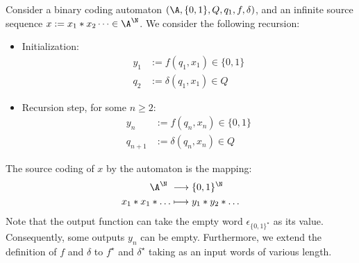 \documentclass[toc]{../cs-classes/cs-classes}
\begin{document}
\begin{definition}
    Consider a binary coding automaton $(\A, \{0, 1\}, Q, q_1, f, \delta)$, and an infinite source sequence $x:=x_1*x_2\dots\in\A^\N$.
    We consider the following recursion:
    \begin{itemize}
        \item Initialization:
        \begin{equation*}
            \begin{aligned}
                y_1 &:= f(q_1, x_1) \in \{0, 1\}\\
                q_2 &:= \delta(q_1, x_1) \in Q
            \end{aligned}
        \end{equation*}
        \item Recursion step, for some $n\geq2$:
        \begin{equation*}
            \begin{aligned}
                y_n &:= f(q_n, x_n) \in \{0, 1\}\\
                q_{n+1} &:= \delta(q_n, x_n) \in Q
            \end{aligned}
        \end{equation*}
    \end{itemize}
    The source coding of $x$ by the automaton is the mapping:
    \begin{equation*}
        \begin{aligned}
            \A^\N &\longrightarrow \{0, 1\}^\N\\
            x_1*x_1*\dots &\longmapsto y_1*y_2*\dots
        \end{aligned}
    \end{equation*}
    Note that the output function can take the empty word $\epsilon_{\{0, 1\}^\star}$ as its value. Consequently, some outputs $y_n$ can be empty. Furthermore, we extend the definition of $f$ and $\delta$ to $f^\star$ and $\delta^\star$ taking as an input words of various length.
\end{definition}
\end{document}
